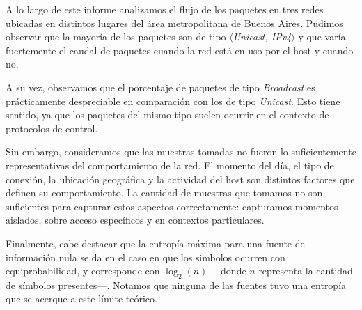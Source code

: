 
A lo largo de este informe analizamos el flujo de los paquetes en tres redes ubicadas en distintos lugares del área metropolitana de Buenos Aires. Pudimos observar que la mayoría de los paquetes son de tipo \textit{$\langle$Unicast, IPv4$\rangle$} y que varía fuertemente el caudal de paquetes cuando la red está en uso por el host y cuando no. 

A su vez, observamos que el porcentaje de paquetes de tipo \textit{Broadcast} es prácticamente despreciable en comparación con los de tipo \textit{Unicast}. Esto tiene sentido, ya que los paquetes del mismo tipo suelen ocurrir en el contexto de protocolos de control.

Sin embargo, consideramos que las muestras tomadas no fueron lo suficientemente representativas del comportamiento de la red. El momento del día, el tipo de conexión, la ubicación geográfica y la actividad del host son distintos factores que definen su comportamiento. La cantidad de muestras que tomamos no son suficientes para capturar estos aspectos correctamente: capturamos momentos aislados, sobre acceso específicos y en contextos particulares.

Finalmente, cabe destacar que la entropía máxima para una fuente de información nula se da en el caso en que los simbolos ocurren con equiprobabilidad, y  corresponde con $\log_2(n)$ ---donde $n$ representa la cantidad de símbolos presentes---. Notamos que ninguna de las fuentes tuvo una entropía que se acerque a este límite teórico. 

